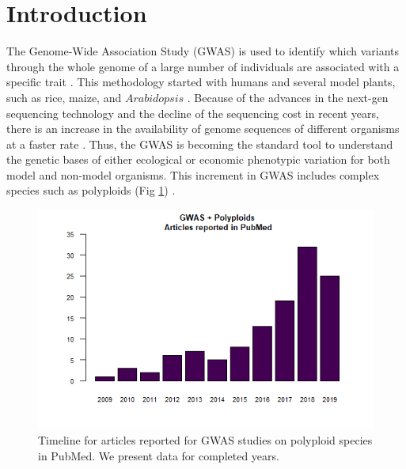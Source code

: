 \documentclass{article}
\begin{document}
\section{Introduction}


The Genome-Wide Association Study (GWAS) is used to identify which variants through the whole genome of a large number of individuals are associated with a specific trait \cite{cantor2010prioritizing, begum2012comprehensive}. This methodology started with humans and several model plants, such as rice, maize, and $Arabidopsis$ \cite{lauc2010genomics, tian2011genome, cao2011whole, korte2013advantages, han2013sequencing}. Because of the advances in the next-gen sequencing technology and the decline of the sequencing cost in recent years, there is an increase in the availability of genome sequences of different organisms at a faster rate \cite{ekblom2011applications, ellegren2014genome}. Thus, the GWAS is becoming the standard tool to understand the genetic bases of either ecological or economic phenotypic variation for both model and non-model organisms. This increment in GWAS includes complex species such as polyploids (Fig \ref{GWASpolyploids}) \cite{ekblom2011applications, santure2018wild}. 

\begin{figure}
\begin{center}
    
\includegraphics[width=12cm]{images/GWASpolyploids.png}

\caption{Timeline for articles reported for GWAS studies on polyploid species in PubMed. We present data for completed years.\label{GWASpolyploids}}
\end{center}

\end{figure}
\end{document}
